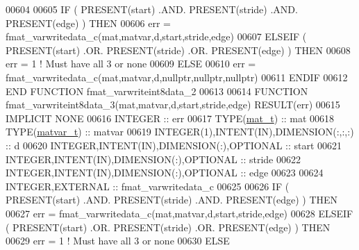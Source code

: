 \begin{DoxyCode}
00604 
00605     \textcolor{keywordflow}{IF} ( \textcolor{keyword}{PRESENT}(start) .AND. \textcolor{keyword}{PRESENT}(stride) .AND. \textcolor{keyword}{PRESENT}(edge) ) \textcolor{keywordflow}{THEN}
00606         err = fmat\_varwritedata\_c(mat,matvar,d,start,stride,edge)
00607     \textcolor{keywordflow}{ELSEIF} ( \textcolor{keyword}{PRESENT}(start) .OR. \textcolor{keyword}{PRESENT}(stride) .OR. \textcolor{keyword}{PRESENT}(edge) ) \textcolor{keywordflow}{THEN}
00608         err = 1    \textcolor{comment}{! Must have all 3 or none}
00609     \textcolor{keywordflow}{ELSE}
00610         err = fmat\_varwritedata\_c(mat,matvar,d,nullptr,nullptr,nullptr)
00611 \textcolor{keywordflow}{    ENDIF}
00612 \textcolor{keyword}{END FUNCTION }fmat\_varwriteint8data\_2
00613 
00614 \textcolor{keyword}{FUNCTION }fmat\_varwriteint8data\_3(mat,matvar,d,start,stride,edge) \textcolor{keyword}{RESULT}(err)
00615 \textcolor{keywordtype}{IMPLICIT NONE}
00616     \textcolor{keywordtype}{INTEGER}                                  :: err
00617     \textcolor{keywordtype}{TYPE}(\hyperlink{group___m_a_t_gab0fc888f5a5d79943b16284b1f91c2e8}{mat\_t})                              :: mat
00618     \textcolor{keywordtype}{TYPE}(\hyperlink{group___m_a_t_structmatvar__t}{matvar\_t})                           :: matvar
00619     \textcolor{keywordtype}{INTEGER(1)},\textcolor{keywordtype}{INTENT(IN)},\textcolor{keywordtype}{DIMENSION(:,:,:)}   :: d
00620     \textcolor{keywordtype}{INTEGER},\textcolor{keywordtype}{INTENT(IN)},\textcolor{keywordtype}{DIMENSION(:)},\textcolor{keywordtype}{OPTIONAL} :: start
00621     \textcolor{keywordtype}{INTEGER},\textcolor{keywordtype}{INTENT(IN)},\textcolor{keywordtype}{DIMENSION(:)},\textcolor{keywordtype}{OPTIONAL} :: stride
00622     \textcolor{keywordtype}{INTEGER},\textcolor{keywordtype}{INTENT(IN)},\textcolor{keywordtype}{DIMENSION(:)},\textcolor{keywordtype}{OPTIONAL} :: edge
00623 
00624     \textcolor{keywordtype}{INTEGER},\textcolor{keywordtype}{EXTERNAL}                         :: fmat\_varwritedata\_c
00625 
00626     \textcolor{keywordflow}{IF} ( \textcolor{keyword}{PRESENT}(start) .AND. \textcolor{keyword}{PRESENT}(stride) .AND. \textcolor{keyword}{PRESENT}(edge) ) \textcolor{keywordflow}{THEN}
00627         err = fmat\_varwritedata\_c(mat,matvar,d,start,stride,edge)
00628     \textcolor{keywordflow}{ELSEIF} ( \textcolor{keyword}{PRESENT}(start) .OR. \textcolor{keyword}{PRESENT}(stride) .OR. \textcolor{keyword}{PRESENT}(edge) ) \textcolor{keywordflow}{THEN}
00629         err = 1    \textcolor{comment}{! Must have all 3 or none}
00630     \textcolor{keywordflow}{ELSE}

\end{DoxyCode}
